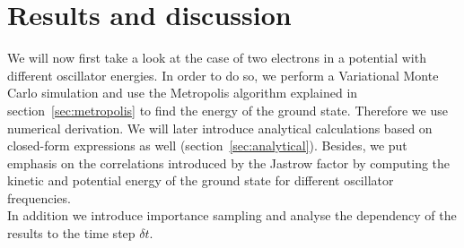 \section{Results and discussion}\label{sec:result}
We will now first take a look at the case of two electrons in a potential with different oscillator energies. In order to do so, we perform a Variational Monte Carlo simulation and use the Metropolis algorithm explained in section~\ref{sec:metropolis} to find the energy of the ground state. Therefore we use numerical derivation. We will later introduce analytical calculations based on closed-form expressions as well (section~\ref{sec:analytical}). Besides, we put emphasis on the correlations introduced by the Jastrow factor by computing the kinetic and potential energy of the ground state for different oscillator frequencies.\\
In addition we introduce importance sampling and analyse the dependency of the results to the time step $\delta t$.\\
